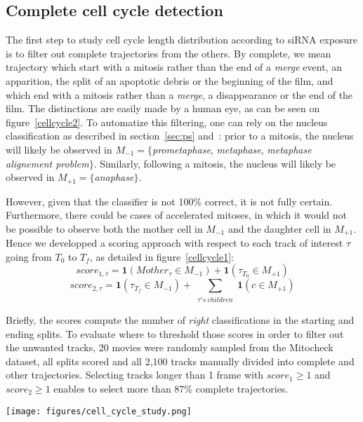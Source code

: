\subsection{Complete cell cycle detection}
The first step to study cell cycle length distribution according to siRNA exposure is to filter out complete trajectories from the others. By complete, we mean trajectory which start with a mitosis rather than the end of a \textit{merge} event, an apparition, the split of an apoptotic debris or the beginning of the film, and which end with a mitosis rather than a \textit{merge}, a disappearance or the end of the film. The distinctions are easily made by a human eye, as can be seen on figure~\ref{cellcycle2}. To automatize this filtering, one can rely on the nucleus classification as described in section~\ref{sec:ps} and~\cite{pmid20360735}: prior to a mitosis, the nucleus will likely be observed in $M_{-1}=\{$\textit{prometaphase}, \textit{metaphase}, \textit{metaphase alignement problem}$\}$. Similarly, following a mitosis, the nucleus will likely be observed in $M_{+1}=\{$\textit{anaphase}$\}$. 

However, given that the classifier is not 100\% correct, it is not fully certain. Furthermore, there could be cases of accelerated mitoses, in which it would not be possible to observe both the mother cell in $M_{-1}$ and the daughter cell in $M_{+1}$. Hence we developped a scoring approach with respect to each track of interest $\tau$ going from $T_0$ to $T_f$, as detailed in figure~\ref{cellcycle1}:
 \[score_{1, \tau} = \mathbf{1} (Mother_\tau \in M_{-1}) + \mathbf{1} (\tau_{T_0} \in M_{+1}) \]
 \[score_{2, \tau} = \mathbf{1} (\tau_{T_f} \in M_{-1}) + \sum_{\substack{\tau 's~ children}}\mathbf{1} (c \in M_{+1}) \]
 
Briefly, the scores compute the number of \textit{right} classifications in the starting and ending splits. To evaluate where to threshold those scores in order to filter out the unwanted tracks, 20 movies were randomly sampled from the Mitocheck dataset, all splits scored and all 2,100 tracks manually divided into complete and other trajectories. Selecting tracks longer than 1 frame with $score_1\geq 1$ and $score_2\geq 1$ enables to select more than 87\% complete trajectories.

\begin{figure*}[ht!]
\centerline{\texttt{[image: figures/cell\_cycle\_study.png]}}
\caption{Approach to cell cycle study}
\label{cellcycle1}
\end{figure*}

